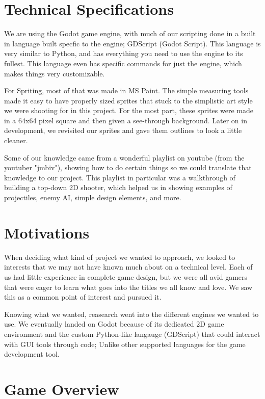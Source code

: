 \documentclass{sigchi}
\begin{document}
\section{Technical Specifications}

We are using the Godot game engine\cite{godot}, with much of our scripting done in a built in language built specfic to the engine; GDScript (Godot Script\cite{gdscript}).
This language is very similar to Python, and has everything you need to use the engine to its fullest. This language even has specific commands for just
the engine, which makes things very customizable.

For Spriting, most of that was made in MS Paint\cite{mspaint}. The simple measuring tools made it easy to have properly sized sprites that stuck to the simplistic art style
we were shooting for in this project. For the most part, these sprites were made in a 64x64 pixel square and then given a see-through background. Later on
in development, we revisited our sprites and gave them outlines to look a little cleaner.

Some of our knowledge came from a wonderful playlist on youtube (from the youtuber "jmbiv"\cite{jmbiv}), showing how to do certain things so we could translate that knowledge to our project.
This playlist in particular was a walkthrough of building a top-down 2D shooter, which helped us in showing examples of projectiles, enemy AI, simple design elements, and more. 



\section{Motivations}

When deciding what kind of project we wanted to approach, we looked to interests that we may not have known much about on a technical level.
Each of us had little experience in complete game design, but we were all avid gamers that were eager
to learn what goes into the titles we all know and love. We saw this as a common point of interest and pursued it.

Knowing what we wanted, reasearch went into the different engines we wanted to use. We eventually landed on Godot because of its dedicated
2D game environment and the custom Python-like langauge (GDScript) that could interact with GUI tools through code; Unlike other supported
languages for the game development tool.


\section{Game Overview}
\end{document}
